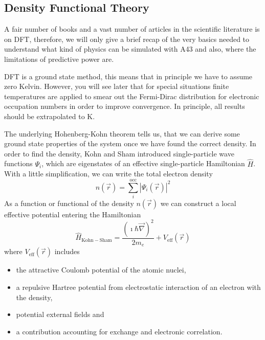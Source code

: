 \documentclass[oribibl]{llncs}
\newcommand{\um}[1]{_{\mathrm{#1}}}
\newcommand{\codename}{A43}
\begin{document}
\subsection{Density Functional Theory} \label{sec:short-theory}
%
A fair number of books and a vast number of articles in the scientific 
literature is on \ac{DFT}, therefore, we will only give a brief recap 
of the very basics needed to understand what kind of physics can be
simulated with \codename{} and also, where the limitations of predictive power
are.

\ac{DFT} is a ground state method, this means that in principle we have to
assume zero Kelvin. However, you will see later that for special situations 
finite temperatures are applied to smear out the Fermi-Dirac distribution 
for electronic occupation numbers in order to improve convergence.
In principle, all results should be extrapolated to \unit[0]{K}.


The underlying Hohenberg-Kohn theorem tells us, that we can derive some 
ground state properties of the system once we have found the correct density.
In order to find the density, Kohn and Sham introduced single-particle wave functions $\Psi_i$, 
which are eigenstates of an effective single-particle Hamiltonian $\hat H$.
With a little simplification, we can write the total electron density
\begin{equation}
	n(\vec r) = \sum_i^{\mathrm{occ}} \left| \Psi_i(\vec r) \right|^2
	\label{eqn:simplified_density_generation}
\end{equation} 
As a function or functional of the density $n(\vec r)$ we can construct
a local effective potential entering the Hamiltonian
\begin{equation}
	\hat H\um{Kohn-Sham} = \frac{\left( \imath \hbar \vec \nabla \right)^2}{2 m_e} + V\um{eff}(\vec r)
	\label{eqn:Kohn-Sham_Hamiltonian_no_spin}
\end{equation} 
where $V\um{eff}(\vec r)$ includes
\begin{itemize}
  \item the attractive Coulomb potential of the atomic nuclei,
  \item a repulsive Hartree potential from electrostatic 
  		interaction of an electron with the density,
  \item potential external fields and
  \item a contribution accounting for exchange and electronic correlation.
\end{itemize}
\end{document}

